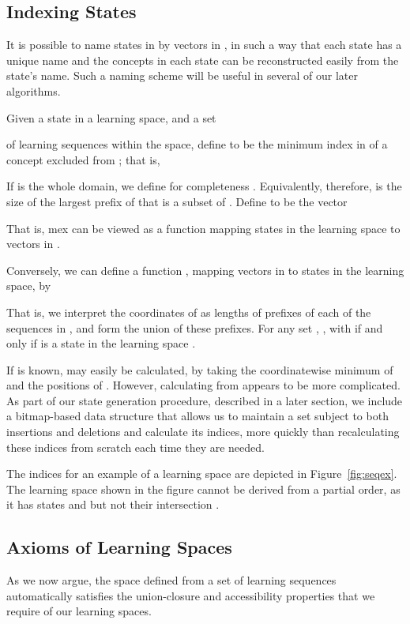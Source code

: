 \documentclass[11pt]{llncs}
\begin{document}
{\subsection{Indexing States}

It is possible to name states in  by vectors in , in such a way that each state has a unique name and the concepts in each state can be reconstructed easily from the state's name. Such a naming scheme will be useful in several of our later algorithms.

Given a state  in a learning space, and a set

of  learning sequences within the space, define  to be the minimum index in  of a concept excluded from ; that is,

If  is the whole domain, we define for completeness . 
Equivalently, therefore,  is the size of the largest prefix of  that is a subset of .
Define  to be the vector

That is, {\rm mex} can be viewed as a function mapping states in the learning space to vectors in .

Conversely, we can define a function , mapping vectors in  to states in the learning space, by

That is, we interpret the coordinates of  as lengths of prefixes of each of the sequences in , and form the union of these prefixes.  For any set ,
, with  if and only if  is a state in the learning space .

If  is known,  may easily be calculated, by 
taking the coordinatewise minimum of  and the positions of .
However, calculating  from  appears to be more complicated.
As part of our state generation procedure, described in a later section, we include a bitmap-based data structure that allows us to maintain a set subject to both insertions and deletions and calculate its  indices, more quickly than recalculating these indices from scratch each time they are needed.

The indices  for an example of a learning space  are depicted in Figure~\ref{fig:seqex}. The learning space shown in the figure cannot be derived from a partial order, as it has states  and  but not their intersection .

\subsection{Axioms of Learning Spaces}

As we now argue, the space  defined from a set  of learning sequences automatically satisfies the union-closure and accessibility properties that we require of our learning spaces.

}
\end{document}
